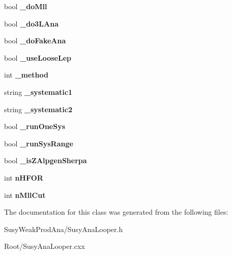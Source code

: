 \begin{DoxyCompactItemize}
\item 
\hypertarget{classSusyAnaLooper_a3637910408e476c7fe31aaffde968051}{
bool {\bfseries \_\-doMll}}
\label{classSusyAnaLooper_a3637910408e476c7fe31aaffde968051}

\item 
\hypertarget{classSusyAnaLooper_a61e38a93167d95eddc5f7264d3434392}{
bool {\bfseries \_\-do3LAna}}
\label{classSusyAnaLooper_a61e38a93167d95eddc5f7264d3434392}

\item 
\hypertarget{classSusyAnaLooper_ad4b5feb17de5aa42beee87ed11d55f4a}{
bool {\bfseries \_\-doFakeAna}}
\label{classSusyAnaLooper_ad4b5feb17de5aa42beee87ed11d55f4a}

\item 
\hypertarget{classSusyAnaLooper_abd7f5f7b9bd28a31c84d19df8c8867cd}{
bool {\bfseries \_\-useLooseLep}}
\label{classSusyAnaLooper_abd7f5f7b9bd28a31c84d19df8c8867cd}

\item 
\hypertarget{classSusyAnaLooper_ae904d97e8dc4eb3f570d4a66aa254579}{
int {\bfseries \_\-method}}
\label{classSusyAnaLooper_ae904d97e8dc4eb3f570d4a66aa254579}

\item 
\hypertarget{classSusyAnaLooper_a04596315fc5cb71d0b092e2aebaa2d00}{
string {\bfseries \_\-systematic1}}
\label{classSusyAnaLooper_a04596315fc5cb71d0b092e2aebaa2d00}

\item 
\hypertarget{classSusyAnaLooper_a315c36d8de239382f1b0f82ef2f06080}{
string {\bfseries \_\-systematic2}}
\label{classSusyAnaLooper_a315c36d8de239382f1b0f82ef2f06080}

\item 
\hypertarget{classSusyAnaLooper_a8537a1bce47f9727fd7cf4d453805d17}{
bool {\bfseries \_\-runOneSys}}
\label{classSusyAnaLooper_a8537a1bce47f9727fd7cf4d453805d17}

\item 
\hypertarget{classSusyAnaLooper_af60f64ae933a9dca8c803493997c0297}{
bool {\bfseries \_\-runSysRange}}
\label{classSusyAnaLooper_af60f64ae933a9dca8c803493997c0297}

\item 
\hypertarget{classSusyAnaLooper_acd9d5ac728222bda4b741678803b63b0}{
bool {\bfseries \_\-isZAlpgenSherpa}}
\label{classSusyAnaLooper_acd9d5ac728222bda4b741678803b63b0}

\item 
\hypertarget{classSusyAnaLooper_ae03bfb0a1cdb54d7fea1f06bdb9aaa92}{
int {\bfseries nHFOR}}
\label{classSusyAnaLooper_ae03bfb0a1cdb54d7fea1f06bdb9aaa92}

\item 
\hypertarget{classSusyAnaLooper_a398f656d353963ca38763265b292526f}{
int {\bfseries nMllCut}}
\label{classSusyAnaLooper_a398f656d353963ca38763265b292526f}

\end{DoxyCompactItemize}


The documentation for this class was generated from the following files:\begin{DoxyCompactItemize}
\item 
SusyWeakProdAna/SusyAnaLooper.h\item 
Root/SusyAnaLooper.cxx\end{DoxyCompactItemize}
